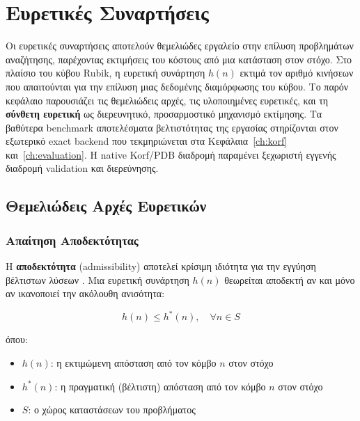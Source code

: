 \chapter{Ευρετικές Συναρτήσεις}
\label{ch:heuristics}


Οι ευρετικές συναρτήσεις αποτελούν θεμελιώδες εργαλείο στην επίλυση
προβλημάτων αναζήτησης, παρέχοντας εκτιμήσεις του κόστους από μια κατάσταση
στον στόχο. Στο πλαίσιο του κύβου Rubik, η ευρετική συνάρτηση $h(n)$ εκτιμά
τον αριθμό κινήσεων που απαιτούνται για την επίλυση μιας δεδομένης
διαμόρφωσης του κύβου. Το παρόν κεφάλαιο παρουσιάζει τις θεμελιώδεις αρχές,
τις υλοποιημένες ευρετικές, και τη \textbf{σύνθετη ευρετική} ως διερευνητικό,
προσαρμοστικό μηχανισμό εκτίμησης. Τα βαθύτερα benchmark αποτελέσματα
βελτιστότητας της εργασίας στηρίζονται στον εξωτερικό exact backend που
τεκμηριώνεται στα Κεφάλαια~\ref{ch:korf} και~\ref{ch:evaluation}. Η native
Korf/PDB διαδρομή παραμένει ξεχωριστή εγγενής διαδρομή validation και
διερεύνησης.

\section{Θεμελιώδεις Αρχές Ευρετικών}
\label{sec:heuristic-fundamentals}

\subsection{Απαίτηση Αποδεκτότητας}
\label{subsec:admissibility}

Η \textbf{αποδεκτότητα} (admissibility) αποτελεί κρίσιμη ιδιότητα για την εγγύηση βέλτιστων λύσεων \cite{hart1968formal}. Μια ευρετική συνάρτηση $h(n)$ θεωρείται αποδεκτή αν και μόνο αν ικανοποιεί την ακόλουθη ανισότητα:

\begin{equation}
\label{eq:admissibility}
h(n) \leq h^{*}(n), \quad \forall n \in S
\end{equation}

\noindent όπου:
\begin{itemize}
    \item $h(n)$: η εκτιμώμενη απόσταση από τον κόμβο $n$ στον στόχο
    \item $h^{*}(n)$: η πραγματική (βέλτιστη) απόσταση από τον κόμβο $n$ στον στόχο
    \item $S$: ο χώρος καταστάσεων του προβλήματος
\end{itemize}

